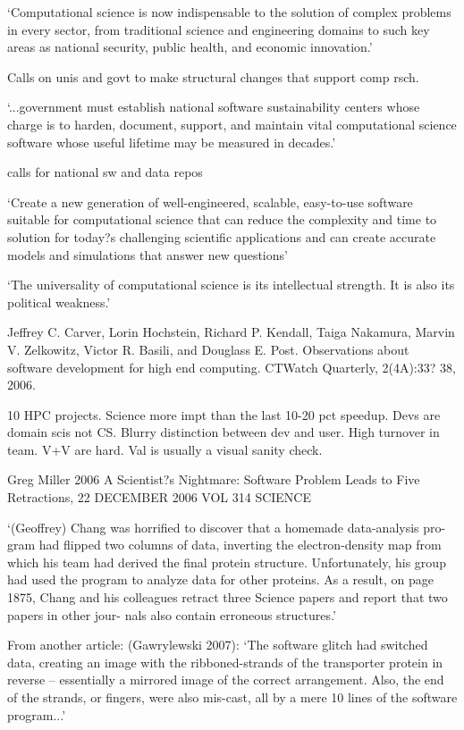 \documentclass[12pt]{amsart}
\begin{document}
`Computational science is now indispensable to the solution of complex problems in every sector, from traditional science and engineering domains to such key areas as national security, public health, and economic innovation.'

Calls on unis and govt to make structural changes that support comp rsch. 

`...government must establish national software sustainability centers whose charge is to harden, document, support, and maintain vital computational science software whose useful lifetime may be measured in decades.'

calls for national sw and data repos

`Create a new generation of well-engineered, scalable, easy-to-use software suitable for computational science that can reduce the complexity and time to solution for today?s challenging scientific applications and can create accurate models and simulations that answer new questions'

`The universality of computational science is its intellectual strength. It is also its political weakness.'



Jeffrey C. Carver, Lorin Hochstein, Richard P. Kendall, Taiga Nakamura, Marvin V. Zelkowitz, Victor R. Basili, and Douglass E. Post. Observations about software development for high end computing. CTWatch Quarterly, 2(4A):33? 38, 2006.
 
10 HPC projects. Science more impt than the last 10-20 pct speedup. Devs are domain scis not CS. Blurry distinction between dev and user. High turnover in team. V+V are hard. Val is usually a visual sanity check.



Greg Miller 2006 A Scientist?s Nightmare: Software Problem Leads to Five Retractions, 22 DECEMBER 2006 VOL 314 SCIENCE

`(Geoffrey) Chang was horrified to discover
that a homemade data-analysis pro-
gram had flipped two columns of
data, inverting the electron-density
map from which his team had
derived the final protein structure. Unfortunately, his group had used
the program to analyze data for
other proteins. As a result, on page 1875, Chang and his colleagues retract three Science papers and report that two papers in other jour- nals also contain erroneous structures.'

From another article: (Gawrylewski 2007): `The software glitch had switched data, creating an image with the ribboned-strands of the transporter protein in reverse -- essentially a mirrored image of the correct arrangement. Also, the end of the strands, or fingers, were also mis-cast, all by a mere 10 lines of the software program...'
\end{document}
